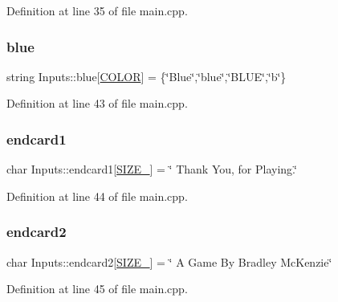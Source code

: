 Definition at line 35 of file main.\+cpp.

\mbox{\label{struct_inputs_a685a6f5b41c965ecc2ff5ede529649da}} 
\subsubsection{\texorpdfstring{blue}{blue}}
{\footnotesize\ttfamily string Inputs\+::blue\mbox{[}\hyperlink{main_8cpp_aa6d8034c897057de595a4511a4e7a837}{C\+O\+L\+OR}\mbox{]} = \{\char`\"{}Blue\char`\"{},\char`\"{}blue\char`\"{},\char`\"{}B\+L\+UE\char`\"{},\char`\"{}b\char`\"{}\}}



Definition at line 43 of file main.\+cpp.

\mbox{\label{struct_inputs_aeaa5f5939511046bc20580b4f9ffb4af}} 
\subsubsection{\texorpdfstring{endcard1}{endcard1}}
{\footnotesize\ttfamily char Inputs\+::endcard1\mbox{[}\hyperlink{main_8cpp_a449535d4215a26529b13febc509c199c}{S\+I\+Z\+E\+\_}\mbox{]} = \char`\"{} Thank You, for Playing.\char`\"{}}



Definition at line 44 of file main.\+cpp.

\mbox{\label{struct_inputs_a1b0aa4e5a7bbc8c59633477ab06b90ec}} 
\subsubsection{\texorpdfstring{endcard2}{endcard2}}
{\footnotesize\ttfamily char Inputs\+::endcard2\mbox{[}\hyperlink{main_8cpp_aef76f3385c12d0d696e38d02a917359f}{S\+I\+Z\+E\+\_}\mbox{]} = \char`\"{} A Game By Bradley Mc\+Kenzie\char`\"{}}



Definition at line 45 of file main.\+cpp.

\mbox{\label{struct_inputs_a55580df8b5ddf655fc8f144ac1037863}} 
